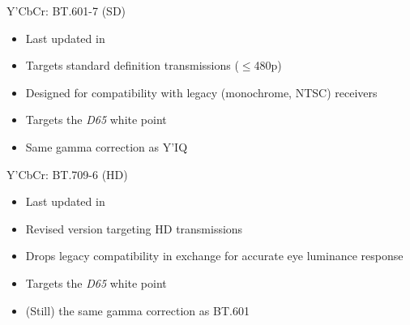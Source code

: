 \documentclass[aspectratio=169,handout,usepdftitle=false]{fireshonks}
\begin{document}
\begin{frame}{Y'CbCr: BT.601-7 (SD)}
    \begin{itemize}
        \item Last updated in \cite*{BT601}
        \item Targets standard definition transmissions ($\leq$480p)
        \item Designed for compatibility with legacy (monochrome, NTSC) receivers
        \item Targets the \emph{D65} white point
        \item Same gamma correction as Y'IQ
    \end{itemize}

\end{frame}
\begin{frame}{Y'CbCr: BT.709-6 (HD)}
    \begin{itemize}
        \item Last updated in \cite*{BT709}
        \item Revised version targeting HD transmissions
        \item Drops legacy compatibility in exchange for accurate eye luminance response
        \item Targets the \emph{D65} white point
        \item (Still) the same gamma correction as BT.601
    \end{itemize}

\end{frame}
\end{document}
